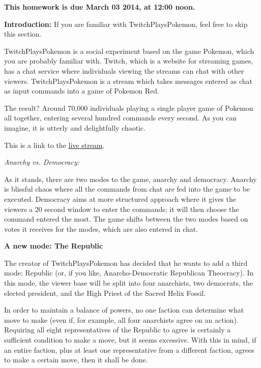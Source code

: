 \documentclass[]{article}
\begin{document}
\maketitle
{}
\vspace{0.5em}
{\Large{\textbf{This homework is due March 03 2014, at 12:00 noon.}}}

\begin{qunlist}
  

  \textbf{Introduction:}
  If you are familiar with TwitchPlaysPokemon, feel free to skip this section.

  TwitchPlaysPokemon is a social experiment based on the game Pokemon, which you are probably familiar with.
  Twitch, which is a website for streaming games, has a chat service where individuals viewing the streams can chat with other viewers.
  TwitchPlaysPokemon is a stream which takes messages entered as chat as input commands into a game of Pokemon Red.

  The result? Around 70,000 individuals playing a single player game of Pokemon all together, 
  entering several hundred commands every second.
  As you can imagine, it is utterly and delightfully chaotic.

  This is a link to the \href{http://www.twitch.tv/twitchplayspokemon}{live stream}.

  \textit{Anarchy vs. Democracy:}

  As it stands, there are two modes to the game, anarchy and democracy.
  Anarchy is blissful chaos where all the commands from chat are fed into the game to be executed.
  Democracy aims at more structured approach where it gives the viewers a 20 second window to enter the commands; 
  it will then choose the command entered the most.
  The game shifts between the two modes based on votes it receives for the modes, which are also entered in chat.

  \textbf{A new mode: The Republic}

  The creator of TwitchPlaysPokemon has decided that he wants to add a third mode: Republic (or, if you like, Anarcho-Democratic Republican Theocracy). 
  In this mode, the viewer base will be split into four anarchists, two democrats, the elected president, and the High Priest of the Sacred Helix Fossil. 

  In order to maintain a balance of powers, no one faction can determine what move to make (even if, for example, all four anarchists agree on an action). 
  Requiring all eight representatives of the Republic to agree is certainly a sufficient condition to make a move, but it seems excessive. 
  With this in mind, if an entire faction, plus at least one representative from a different faction, agrees to make a certain move, then it shall be done.


\end{qunlist}
\end{document}
